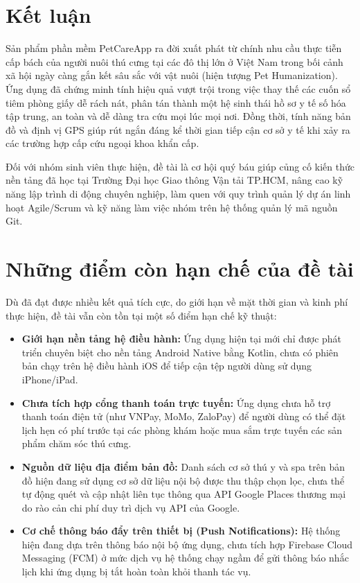 \section{Kết luận}
\label{sec:ket_luan}

Sản phẩm phần mềm PetCareApp ra đời xuất phát từ chính nhu cầu thực tiễn cấp bách của người nuôi thú cưng tại các đô thị lớn ở Việt Nam trong bối cảnh xã hội ngày càng gắn kết sâu sắc với vật nuôi (hiện tượng Pet Humanization). Ứng dụng đã chứng minh tính hiệu quả vượt trội trong việc thay thế các cuốn sổ tiêm phòng giấy dễ rách nát, phân tán thành một hệ sinh thái hồ sơ y tế số hóa tập trung, an toàn và dễ dàng tra cứu mọi lúc mọi nơi. Đồng thời, tính năng bản đồ và định vị GPS giúp rút ngắn đáng kể thời gian tiếp cận cơ sở y tế khi xảy ra các trường hợp cấp cứu ngoại khoa khẩn cấp.

Đối với nhóm sinh viên thực hiện, đề tài là cơ hội quý báu giúp củng cố kiến thức nền tảng đã học tại Trường Đại học Giao thông Vận tải TP.HCM, nâng cao kỹ năng lập trình di động chuyên nghiệp, làm quen với quy trình quản lý dự án linh hoạt Agile/Scrum và kỹ năng làm việc nhóm trên hệ thống quản lý mã nguồn Git.

\section{Những điểm còn hạn chế của đề tài}
\label{sec:han_che}

Dù đã đạt được nhiều kết quả tích cực, do giới hạn về mặt thời gian và kinh phí thực hiện, đề tài vẫn còn tồn tại một số điểm hạn chế kỹ thuật:
\begin{itemize}
    \item \textbf{Giới hạn nền tảng hệ điều hành:} Ứng dụng hiện tại mới chỉ được phát triển chuyên biệt cho nền tảng Android Native bằng Kotlin, chưa có phiên bản chạy trên hệ điều hành iOS để tiếp cận tệp người dùng sử dụng iPhone/iPad.
    \item \textbf{Chưa tích hợp cổng thanh toán trực tuyến:} Ứng dụng chưa hỗ trợ thanh toán điện tử (như VNPay, MoMo, ZaloPay) để người dùng có thể đặt lịch hẹn có phí trước tại các phòng khám hoặc mua sắm trực tuyến các sản phẩm chăm sóc thú cưng.
    \item \textbf{Nguồn dữ liệu địa điểm bản đồ:} Danh sách cơ sở thú y và spa trên bản đồ hiện đang sử dụng cơ sở dữ liệu nội bộ được thu thập chọn lọc, chưa thể tự động quét và cập nhật liên tục thông qua API Google Places thương mại do rào cản chi phí duy trì dịch vụ API của Google.
    \item \textbf{Cơ chế thông báo đẩy trên thiết bị (Push Notifications):} Hệ thống hiện đang dựa trên thông báo nội bộ ứng dụng, chưa tích hợp Firebase Cloud Messaging (FCM) ở mức dịch vụ hệ thống chạy ngầm để gửi thông báo nhắc lịch khi ứng dụng bị tắt hoàn toàn khỏi thanh tác vụ.
\end{itemize}

